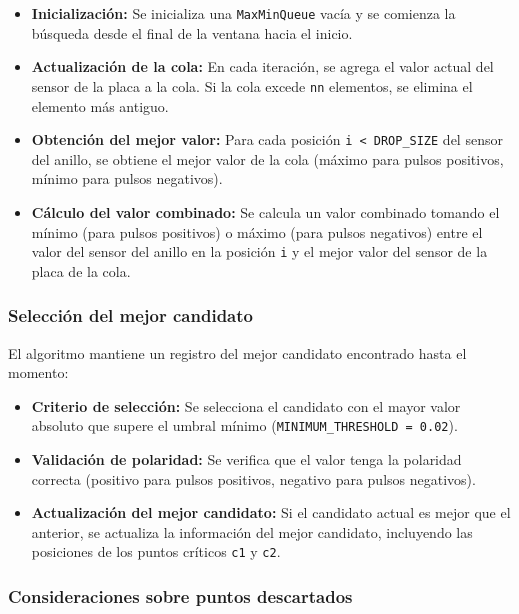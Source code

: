\documentclass[12pt,a4paper]{article}
\begin{document}
\begin{itemize}
    \item \textbf{Inicialización:} Se inicializa una \texttt{MaxMinQueue} vacía y se comienza la búsqueda desde el final de la ventana hacia el inicio.
    
    \item \textbf{Actualización de la cola:} En cada iteración, se agrega el valor actual del sensor de la placa a la cola. Si la cola excede \texttt{nn} elementos, se elimina el elemento más antiguo.
    
    \item \textbf{Obtención del mejor valor:} Para cada posición \texttt{i < DROP\_SIZE} del sensor del anillo, se obtiene el mejor valor de la cola (máximo para pulsos positivos, mínimo para pulsos negativos).
    
    \item \textbf{Cálculo del valor combinado:} Se calcula un valor combinado tomando el mínimo (para pulsos positivos) o máximo (para pulsos negativos) entre el valor del sensor del anillo en la posición \texttt{i} y el mejor valor del sensor de la placa de la cola.
\end{itemize}

\subsubsection{Selección del mejor candidato}

El algoritmo mantiene un registro del mejor candidato encontrado hasta el momento:

\begin{itemize}
    \item \textbf{Criterio de selección:} Se selecciona el candidato con el mayor valor absoluto que supere el umbral mínimo (\texttt{MINIMUM\_THRESHOLD = 0.02}).
    
    \item \textbf{Validación de polaridad:} Se verifica que el valor tenga la polaridad correcta (positivo para pulsos positivos, negativo para pulsos negativos).
    
    \item \textbf{Actualización del mejor candidato:} Si el candidato actual es mejor que el anterior, se actualiza la información del mejor candidato, incluyendo las posiciones de los puntos críticos \texttt{c1} y \texttt{c2}.
\end{itemize}

\subsubsection{Consideraciones sobre puntos descartados}
\end{document}
